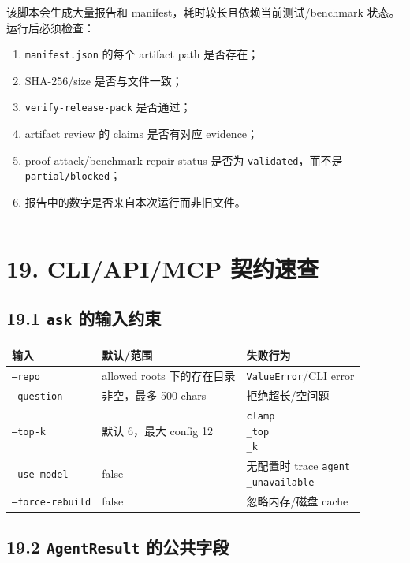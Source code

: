 \documentclass[UTF8,12pt,openany]{ctexbook}
\begin{document}
该脚本会生成大量报告和 manifest，耗时较长且依赖当前测试/benchmark 状态。运行后必须检查：\par

\begin{enumerate}
\item \texttt{manifest.json} 的每个 artifact path 是否存在；
\item SHA-256/size 是否与文件一致；
\item \texttt{verify-release-pack} 是否通过；
\item artifact review 的 claims 是否有对应 evidence；
\item proof attack/benchmark repair status 是否为 \texttt{validated}，而不是 \texttt{partial/blocked}；
\item 报告中的数字是否来自本次运行而非旧文件。
\end{enumerate}

\hrule

\section{19. CLI/API/MCP 契约速查}

\subsection{19.1 \texttt{ask} 的输入约束}

\begin{center}
\small
\begin{longtable}{|p{}|p{}|p{}|}
\toprule
输入 & 默认/范围 & 失败行为 \\
\midrule
\texttt{--repo} & allowed roots 下的存在目录 & \texttt{ValueError}/CLI error \\
\texttt{--question} & 非空，最多 500 chars & 拒绝超长/空问题 \\
\texttt{--top-k} & 默认 6，最大 config 12 & \texttt{clamp\\_top\\_k} \\
\texttt{--use-model} & false & 无配置时 trace \texttt{agent\\_unavailable} \\
\texttt{--force-rebuild} & false & 忽略内存/磁盘 cache \\
\bottomrule
\end{longtable}
\end{center}

\subsection{19.2 \texttt{AgentResult} 的公共字段}
\end{document}
